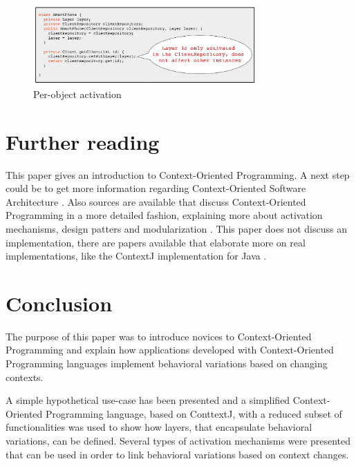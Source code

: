 \documentclass{acm_proc_article-sp}
\begin{document}
\begin{figure}[H]
\centering
\includegraphics[width=85mm]{per_object_activation2.png}
\caption{Per-object activation}
\label{fig:per_object_activation}
\end{figure}

\section{Further reading}
\label{sec:further_reading}
This paper gives an introduction to Context-Oriented Programming. A next step could be to get more information regarding Context-Oriented Software Architecture \cite{Mens:2016:CSA:2951965.2951971}. Also sources are available that discuss Context-Oriented Programming in a more detailed fashion, explaining more about activation mechanisms, design patters and modularization \cite{SALVANESCHI20121801}. This paper does not discuss an implementation, there are papers available that elaborate more on real implementations, like the ContextJ implementation for Java \cite{Appeltauer:2009:IDC:1562112.1562117}. 

\section{Conclusion}
\label{sec:conclusion}
The purpose of this paper was to introduce novices to Context-Oriented Programming and explain how applications developed with Context-Oriented Programming languages implement behavioral variations based on changing contexts. 

A simple hypothetical use-case has been presented and a simplified Context-Oriented Programming language, based on ConttextJ, with a reduced subset of functionalities was used to show how layers, that encapsulate behavioral variations, can be defined. Several types of activation mechanisms were presented that can be used in order to link behavioral variations based on context changes. 



\end{document}
